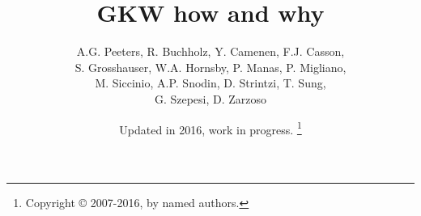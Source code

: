 \documentclass[fleqn]{report}
\begin{document}
\title{GKW how and why}

\author{A.G. Peeters, R. Buchholz, Y. Camenen, F.J. Casson, \\ 
        S. Grosshauser, W.A. Hornsby, P. Manas, P. Migliano, \\
        M. Siccinio, A.P. Snodin, D. Strintzi, T. Sung, \\ 
        G. Szepesi, D. Zarzoso}  

\date{Updated in 2016, work in progress. \thanks{Copyright \copyright{}
2007-2016, by named authors.}}

\maketitle

\setlength{\parskip}{8pt}
\setlength{\parindent}{0pt}















\begin{appendix}






\end{appendix}

\setlength{\parskip}{0pt}
\setlength{\parindent}{0pt}



\end{document}

